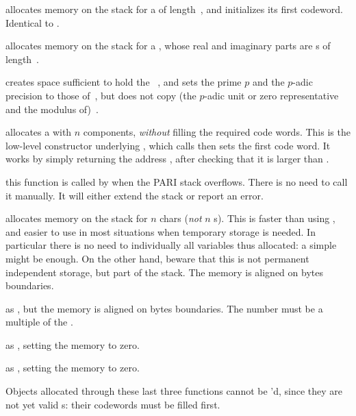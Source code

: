  allocates memory on the stack for a 
of length~, and initializes its first codeword. Identical to
.

 allocates memory on the stack for a
, whose real and imaginary parts are s
of length~.

 creates space sufficient to hold the
~, and sets the prime $p$ and the $p$-adic precision to
those of~, but does not copy (the $p$-adic unit or zero representative
and the modulus of)~.

 allocates a  with $n$ components,
\emph{without} filling the required code words. This is the low-level
constructor underlying , which calls  then sets
the first code word. It works by simply returning the address
, after checking that it is larger than .

 this function is called by
 when the PARI stack overflows. There is no need to call it
manually. It will either extend the stack or report an  error.

 allocates memory on the stack for $n$
chars (\emph{not} $n$ s). This is faster than using ,
and easier to use in most situations when temporary storage is needed. In
particular there is no need to  individually all variables thus
allocated: a simple  might be enough. On the other hand,
beware that this is not permanent independent storage, but part of the stack.
The memory is aligned on  bytes boundaries.

 as ,
but the memory is aligned on  bytes boundaries. The number must
be a multiple of the .

 as , setting the memory
to zero.

 as
, setting the memory to zero.

\noindent Objects allocated through these last three functions cannot be
'd, since they are not yet valid s: their codewords
must be filled first.

